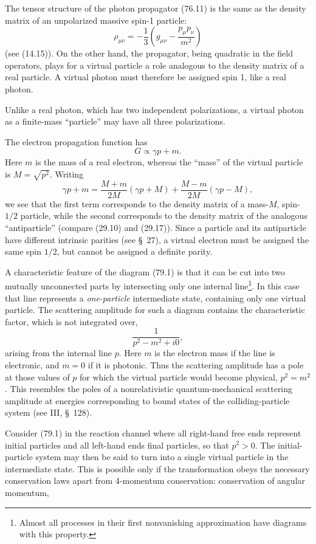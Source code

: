 The tensor structure of the photon propagator (76.11) is the same as the density matrix of an unpolarized massive spin-1 particle:
\[
\rho_{\mu\nu}=-\frac{1}{3}\left(g_{\mu\nu}-\frac{p_\mu p_\nu}{m^2}\right)
\]
(see (14.15)). On the other hand, the propagator, being quadratic in the field operators, plays for a virtual particle a role analogous to the density matrix of a real particle. A virtual photon must therefore be assigned spin 1, like a real photon.

Unlike a real photon, which has two independent polarizations, a virtual photon as a finite-mass ``particle'' may have all three polarizations.

The electron propagation function has
\[
G\propto\gamma p+m.
\]
Here $m$ is the mass of a real electron, whereas the ``mass'' of the virtual particle is $M=\sqrt{p^2}$. Writing
\begin{equation}
\gamma p+m=\frac{M+m}{2M}(\gamma p+M)+\frac{M-m}{2M}(\gamma p-M),
\tag{79.2}
\end{equation}
we see that the first term corresponds to the density matrix of a mass-$M$, spin-$1/2$ particle, while the second corresponds to the density matrix of the analogous ``antiparticle'' (compare (29.10) and (29.17)). Since a particle and its antiparticle have different intrinsic parities (see \S~27), a virtual electron must be assigned the same spin $1/2$, but cannot be assigned a definite parity.

A characteristic feature of the diagram (79.1) is that it can be cut into two mutually unconnected parts by intersecting only one internal line\footnote{Almost all processes in their first nonvanishing approximation have diagrams with this property.}. In this case that line represents a \emph{one-particle} intermediate state, containing only one virtual particle. The scattering amplitude for such a diagram contains the characteristic factor, which is not integrated over,
\[
\frac{1}{p^2-m^2+i0},
\]
arising from the internal line $p$. Here $m$ is the electron mass if the line is electronic, and $m=0$ if it is photonic. Thus the scattering amplitude has a pole at those values of $p$ for which the virtual particle would become physical, $p^2=m^2$. This resembles the poles of a nonrelativistic quantum-mechanical scattering amplitude at energies corresponding to bound states of the colliding-particle system (see III, \S~128).

Consider (79.1) in the reaction channel where all right-hand free ends represent initial particles and all left-hand ends final particles, so that $p^2>0$. The initial-particle system may then be said to turn into a single virtual particle in the intermediate state. This is possible only if the transformation obeys the necessary conservation laws apart from 4-momentum conservation: conservation of angular momentum,

